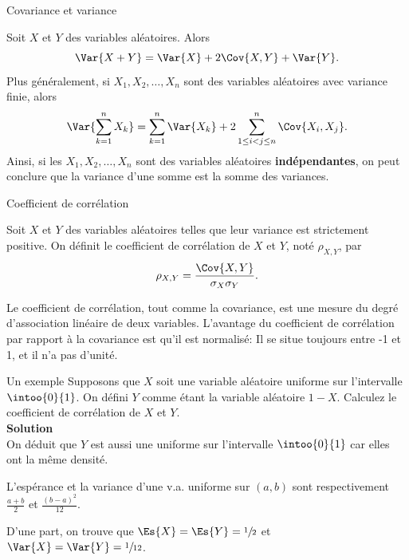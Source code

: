 \documentclass[nuit,charter,pied]{BeamerJS}
\begin{document}
\begin{frame}{Covariance et variance}
	\begin{prop}
		Soit $X$ et $Y$ des variables aléatoires. Alors
		\[\Var{X+Y}=\Var{X}+2\Cov{X,Y}+\Var{Y}.\]
		Plus généralement, si $X_1,X_2,\ldots,X_n$ sont des variables aléatoires avec variance finie, alors
		\[\Var{\sum_{k=1}^nX_k}=\sum_{k=1}^n\Var{X_k}+2\sum_{1\leq i<j\leq n}^n\Cov{X_i,X_j}.\]
		Ainsi, si les $X_1,X_2,\ldots,X_n$ sont des variables aléatoires \textbf{indépendantes}, on peut conclure que la variance d'une somme est la somme des variances.
	\end{prop}

\end{frame}
\begin{frame}{Coefficient de corrélation}
	\pause
	\begin{defn}{}
		Soit $X$ et $Y$ des variables aléatoires telles que leur variance est strictement positive. On définit le coefficient de corrélation de $X$ et $Y$, noté $\rho_{X,Y}$, par
		\[\rho_{X,Y}=\frac{\Cov{X,Y}}{\sigma_X\sigma_Y}.\]
	\end{defn}
	Le coefficient de corrélation, tout comme la covariance, est une mesure du degré d'association linéaire de deux variables. L'avantage du coefficient de corrélation par rapport à la covariance est qu'il est normalisé: Il se situe toujours entre -1 et 1, et il n'a pas d'unité.
\end{frame}
\begin{frame}[t]{Un exemple}
	Supposons que $X$ soit une variable aléatoire uniforme sur l'intervalle $\intoo{0}{1}$. On défini $Y$ comme étant la variable aléatoire $1-X$. Calculez le coefficient de corrélation de $X$ et $Y$.\\
	\textbf{Solution}\\
	On déduit que $Y$ est aussi une uniforme sur l'intervalle $\intoo{0}{1}$ car elles ont la même densité.
	\begin{lumiere}
		L'espérance et la variance d'une v.a. uniforme sur $(a,b)$ sont respectivement $\frac{a+b}{2}$ et $\frac{(b-a)^2}{12}$.
	\end{lumiere}
D'une part,  on trouve que $\Es{X}=\Es{Y}=\sfrac{1}{2}$ et $\Var{X}=\Var{Y}=\sfrac{1}{12}$.
\end{frame}
\end{document}

